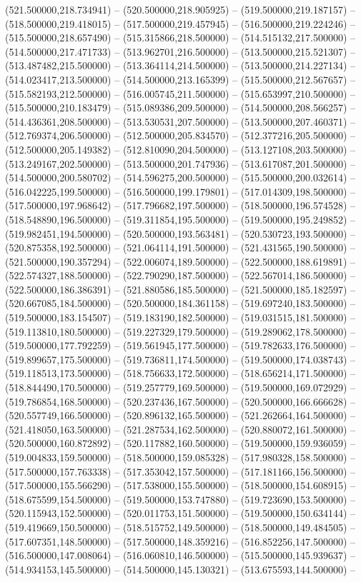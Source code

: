 (521.500000,218.734941) -- (520.500000,218.905925) -- (519.500000,219.187157) -- (518.500000,219.418015) -- (517.500000,219.457945) -- (516.500000,219.224246) -- (515.500000,218.657490) -- (515.315866,218.500000) -- (514.515132,217.500000) -- (514.500000,217.471733) -- (513.962701,216.500000) -- (513.500000,215.521307) -- (513.487482,215.500000) -- (513.364114,214.500000) -- (513.500000,214.227134) -- (514.023417,213.500000) -- (514.500000,213.165399) -- (515.500000,212.567657) -- (515.582193,212.500000) -- (516.005745,211.500000) -- (515.653997,210.500000) -- (515.500000,210.183479) -- (515.089386,209.500000) -- (514.500000,208.566257) -- (514.436361,208.500000) -- (513.530531,207.500000) -- (513.500000,207.460371) -- (512.769374,206.500000) -- (512.500000,205.834570) -- (512.377216,205.500000) -- (512.500000,205.149382) -- (512.810090,204.500000) -- (513.127108,203.500000) -- (513.249167,202.500000) -- (513.500000,201.747936) -- (513.617087,201.500000) -- (514.500000,200.580702) -- (514.596275,200.500000) -- (515.500000,200.032614) -- (516.042225,199.500000) -- (516.500000,199.179801) -- (517.014309,198.500000) -- (517.500000,197.968642) -- (517.796682,197.500000) -- (518.500000,196.574528) -- (518.548890,196.500000) -- (519.311854,195.500000) -- (519.500000,195.249852) -- (519.982451,194.500000) -- (520.500000,193.563481) -- (520.530723,193.500000) -- (520.875358,192.500000) -- (521.064114,191.500000) -- (521.431565,190.500000) -- (521.500000,190.357294) -- (522.006074,189.500000) -- (522.500000,188.619891) -- (522.574327,188.500000) -- (522.790290,187.500000) -- (522.567014,186.500000) -- (522.500000,186.386391) -- (521.880586,185.500000) -- (521.500000,185.182597) -- (520.667085,184.500000) -- (520.500000,184.361158) -- (519.697240,183.500000) -- (519.500000,183.154507) -- (519.183190,182.500000) -- (519.031515,181.500000) -- (519.113810,180.500000) -- (519.227329,179.500000) -- (519.289062,178.500000) -- (519.500000,177.792259) -- (519.561945,177.500000) -- (519.782633,176.500000) -- (519.899657,175.500000) -- (519.736811,174.500000) -- (519.500000,174.038743) -- (519.118513,173.500000) -- (518.756633,172.500000) -- (518.656214,171.500000) -- (518.844490,170.500000) -- (519.257779,169.500000) -- (519.500000,169.072929) -- (519.786854,168.500000) -- (520.237436,167.500000) -- (520.500000,166.666628) -- (520.557749,166.500000) -- (520.896132,165.500000) -- (521.262664,164.500000) -- (521.418050,163.500000) -- (521.287534,162.500000) -- (520.880072,161.500000) -- (520.500000,160.872892) -- (520.117882,160.500000) -- (519.500000,159.936059) -- (519.004833,159.500000) -- (518.500000,159.085328) -- (517.980328,158.500000) -- (517.500000,157.763338) -- (517.353042,157.500000) -- (517.181166,156.500000) -- (517.500000,155.566290) -- (517.538000,155.500000) -- (518.500000,154.608915) -- (518.675599,154.500000) -- (519.500000,153.747880) -- (519.723690,153.500000) -- (520.115943,152.500000) -- (520.011753,151.500000) -- (519.500000,150.634144) -- (519.419669,150.500000) -- (518.515752,149.500000) -- (518.500000,149.484505) -- (517.607351,148.500000) -- (517.500000,148.359216) -- (516.852256,147.500000) -- (516.500000,147.008064) -- (516.060810,146.500000) -- (515.500000,145.939637) -- (514.934153,145.500000) -- (514.500000,145.130321) -- (513.675593,144.500000) -- 